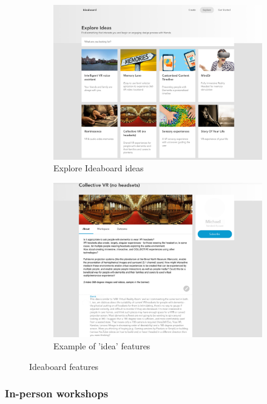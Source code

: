 \begin{figure}
\centering
\begin{subfigure}{.5\textwidth}
  \centering
  \includegraphics[width=.8\linewidth]{Images/DemVR/Ideaboard Ideas.png}
  \caption{Explore Ideaboard ideas}
  \label{fig:exploreIdeaboard}
\end{subfigure}%
\begin{subfigure}{.5\textwidth}
  \centering
  \includegraphics[width=.8\linewidth]{Images/DemVR/Example of idea.png}
  \caption{Example of 'idea' features}
  \label{fig:IdeaboardIdea}
\end{subfigure}
\caption{Ideaboard features}
\label{fig:IdeaboardFeatures}
\end{figure}

\subsubsection{In-person workshops}
\label{sec:in-personWorkshops}

